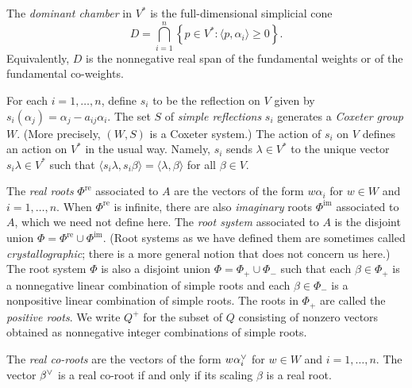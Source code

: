 \documentclass[10pt,a4paper]{amsart}
\theoremstyle{definition}
\DeclareMathOperator{\re}{re}
\DeclareMathOperator{\im}{im}
\newcommand{\newword}[1]{\emph{#1}}
\newcommand{\set}[1]{{\left\lbrace #1 \right\rbrace}}
\newcommand{\br}[1]{{\langle #1 \rangle}}
\newcommand{\ck}{\spcheck}
\begin{document}
The \newword{dominant chamber} in $V^*$ is the full-dimensional simplicial cone
\begin{equation}\label{D def}
D=\bigcap_{i=1}^n \set{p\in V^*: \br{p,\alpha_i}\ge 0}.
\end{equation}
Equivalently, $D$ is the nonnegative real span of the fundamental weights or of the fundamental co-weights.




For each $i=1,\ldots,n$, define $s_i$ to be the reflection on $V$ given by $s_i(\alpha_j)=\alpha_j-a_{ij}\alpha_i$.
The set $S$ of \newword{simple reflections} $s_i$ generates a \newword{Coxeter group} $W$.
(More precisely, $(W,S)$ is a Coxeter system.)
The action of $s_i$ on $V$ defines an action on $V^*$ in the usual way.
Namely, $s_i$ sends $\lambda\in V^*$ to the unique vector $s_i\lambda\in V^*$ such that $\br{s_i\lambda,s_i\beta}=\br{\lambda,\beta}$ for all $\beta\in V$.


The \newword{real roots} $\Phi^{\re}$ associated to $A$ are the vectors of the form $w\alpha_i$ for $w\in W$ and $i=1,\ldots,n$.
When $\Phi^{\re}$ is infinite, there are also \newword{imaginary} roots $\Phi^{\im}$ associated to $A$, which we need not define here.
The \newword{root system} associated to $A$ is the disjoint union $\Phi=\Phi^{\re}\cup\Phi^{\im}$.
(Root systems as we have defined them are sometimes called \newword{crystallographic}; there is a more general notion that does not concern us here.)
The root system $\Phi$ is also a disjoint union $\Phi=\Phi_+\cup\Phi_-$ such that each $\beta\in\Phi_+$ is a nonnegative linear combination of simple roots and each $\beta\in\Phi_-$ is a nonpositive linear combination of simple roots.
The roots in $\Phi_+$ are called the \newword{positive roots}.
We write $Q^+$ for the subset of $Q$ consisting of nonzero vectors obtained as nonnegative integer combinations of simple roots. 


The \newword{real co-roots} %
are the vectors of the form $w\alpha\ck_i$ for $w\in W$ and $i=1,\ldots,n$.
The vector $\beta\ck$ is a real co-root if and only if its scaling $\beta$ is a real root.

\setcounter{theorem}{1}
\end{document}
